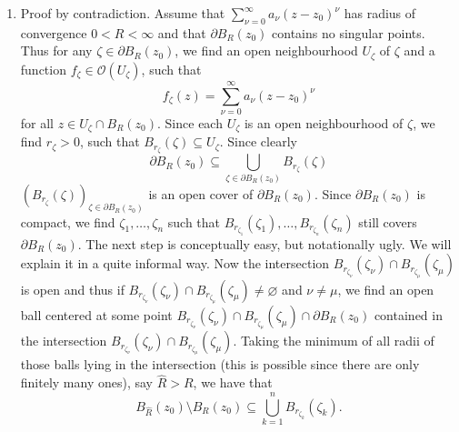 \begin{enumerate}[label = \textbf{Exercise \arabic*.},wide = 0pt, itemsep=1.5ex]
	\item Proof by contradiction. Assume that $\sum_{\nu = 0}^\infty a_\nu(z - z_0)^\nu$ has radius of convergence $0 < R < \infty$ and that $\partial B_R(z_0)$ contains no singular points. Thus for any $\zeta \in \partial B_R(z_0)$, we find an open neighbourhood $U_\zeta$ of $\zeta$ and a function $f_\zeta \in \mathcal{O}(U_\zeta)$, such that 
		\begin{equation}
			f_\zeta(z) = \sum_{\nu = 0}^\infty a_\nu(z - z_0)^\nu
		\end{equation}
		\noindent for all $z \in U_\zeta \cap B_R(z_0)$. Since each $U_\zeta$ is an open neighbourhood of $\zeta$, we find $r_\zeta > 0$, such that $B_{r_\zeta}(\zeta) \subseteq U_\zeta$. Since clearly
		\begin{equation}
			\partial B_R(z_0) \subseteq \bigcup_{\zeta \in \partial B_R(z_0)} B_{r_\zeta}(\zeta)
		\end{equation}
		\noindent $(B_{r_\zeta}(\zeta))_{\zeta \in \partial B_R(z_0)}$ is an open cover of $\partial B_R(z_0)$. Since $\partial B_R(z_0)$ is compact, we find $\zeta_1,\dots,\zeta_n$ such that $B_{r_{\zeta_1}}(\zeta_1),\dots,B_{r_{\zeta_n}}(\zeta_n)$ still covers $\partial B_R(z_0)$. The next step is conceptually easy, but notationally ugly. We will explain it in a quite informal way. Now the intersection $B_{r_{\zeta_\nu}}(\zeta_\nu) \cap B_{r_{\zeta_\mu}}(\zeta_\mu)$ is open and thus if $B_{r_{\zeta_\nu}}(\zeta_\nu) \cap B_{r_{\zeta_\mu}}(\zeta_\mu) \neq \varnothing$ and $\nu \neq \mu$, we find an open ball centered at some point $B_{r_{\zeta_\nu}}(\zeta_\nu) \cap B_{r_{\zeta_\mu}}(\zeta_\mu) \cap \partial B_R(z_0)$ contained in the intersection $B_{r_{\zeta_\nu}}(\zeta_\nu) \cap B_{r_{\zeta_\mu}}(\zeta_\mu)$. Taking the minimum of all radii of those balls lying in the intersection (this is possible since there are only finitely many ones), say $\widehat{R} > R$, we have that
		\begin{equation}
			B_{\widehat{R}}(z_0) \setminus B_R(z_0) \subseteq \bigcup_{k = 1}^n B_{r_{\zeta_k}}(\zeta_k).
			\label{eq:cover}
		\end{equation}

\end{enumerate}
